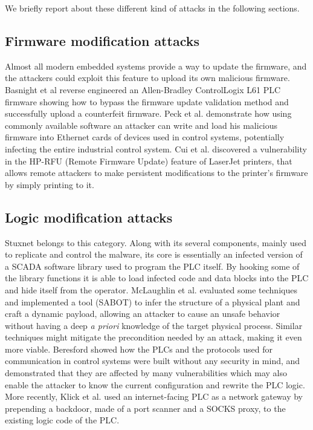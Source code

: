 We briefly report about these different kind of attacks in the following sections.


\subsection{Firmware modification attacks}

Almost all modern embedded systems provide a way to update the firmware, and the attackers could exploit this feature to upload its own malicious firmware.
Basnight et al \cite{firmware-mod} reverse engineered an Allen-Bradley ControlLogix L61 PLC firmware showing how to bypass the
firmware update validation method and successfully upload a counterfeit firmware.
Peck et al. \cite{ethernet-vuln} demonstrate how using commonly available software an attacker can write and load his malicious firmware into Ethernet cards of devices
used in control systems, potentially infecting the entire industrial control system.
Cui et al. \cite{print-vuln} discovered a vulnerability in the HP-RFU (Remote Firmware Update) feature of LaserJet printers,
that allows remote attackers to make persistent modifications to the printer's firmware by simply printing to it.


\subsection{Logic modification attacks}

Stuxnet \cite{stuxnet} belongs to this category. Along with its several components, mainly used to replicate and control the malware,
its core is essentially an infected version of a SCADA software library used to program the PLC itself.
By hooking some of the library functions it is able to load infected code and data blocks into the PLC and hide itself from the operator.
McLaughlin et al. \cite{dynamic-payload,sabot} evaluated some techniques and implemented a tool (SABOT) to infer the structure of a physical plant and craft a dynamic payload,
allowing an attacker to cause an unsafe behavior without having a deep \emph{a priori} knowledge of the target physical process.
Similar techniques might mitigate the precondition needed by an attack, making it even more viable.
Beresford \cite{siemens-s7} showed how the PLCs and the protocols used for communication in control systems were built without any security in mind,
and demonstrated that they are affected by many vulnerabilities which may also enable the attacker to know the current configuration and rewrite the PLC logic.
More recently, Klick et al. \cite{plc-network} used an internet-facing PLC as a network gateway by prepending a backdoor, made of a port scanner and a SOCKS proxy,
to the existing logic code of the PLC.


